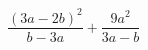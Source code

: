 \begin{ex}[type=expression]
	\begin{condition}
		\(\dfrac{(3a-2b)^2}{b-3a}+\dfrac{9a^2}{3a-b}\)
	\end{condition}
\end{ex}